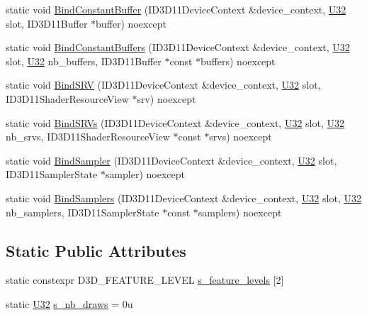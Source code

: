 \begin{DoxyCompactItemize}
\item 
static void \mbox{\hyperlink{structmage_1_1rendering_1_1_pipeline_a983ebf1363c8d3edd6830576e2258e48}{Bind\+Constant\+Buffer}} (I\+D3\+D11\+Device\+Context \&device\+\_\+context, \mbox{\hyperlink{namespacemage_aa5d6eaabaac3cdd01873d6a3d27e90f3}{U32}} slot, I\+D3\+D11\+Buffer $\ast$buffer) noexcept
\item 
static void \mbox{\hyperlink{structmage_1_1rendering_1_1_pipeline_ad3a84d57712b74b98d10946482a78a2b}{Bind\+Constant\+Buffers}} (I\+D3\+D11\+Device\+Context \&device\+\_\+context, \mbox{\hyperlink{namespacemage_aa5d6eaabaac3cdd01873d6a3d27e90f3}{U32}} slot, \mbox{\hyperlink{namespacemage_aa5d6eaabaac3cdd01873d6a3d27e90f3}{U32}} nb\+\_\+buffers, I\+D3\+D11\+Buffer $\ast$const $\ast$buffers) noexcept
\item 
static void \mbox{\hyperlink{structmage_1_1rendering_1_1_pipeline_a28ed2d3639ac344b2d2334de54461ae9}{Bind\+S\+RV}} (I\+D3\+D11\+Device\+Context \&device\+\_\+context, \mbox{\hyperlink{namespacemage_aa5d6eaabaac3cdd01873d6a3d27e90f3}{U32}} slot, I\+D3\+D11\+Shader\+Resource\+View $\ast$srv) noexcept
\item 
static void \mbox{\hyperlink{structmage_1_1rendering_1_1_pipeline_a38de6f4bfefc23eeeb50bdf0cc0e807d}{Bind\+S\+R\+Vs}} (I\+D3\+D11\+Device\+Context \&device\+\_\+context, \mbox{\hyperlink{namespacemage_aa5d6eaabaac3cdd01873d6a3d27e90f3}{U32}} slot, \mbox{\hyperlink{namespacemage_aa5d6eaabaac3cdd01873d6a3d27e90f3}{U32}} nb\+\_\+srvs, I\+D3\+D11\+Shader\+Resource\+View $\ast$const $\ast$srvs) noexcept
\item 
static void \mbox{\hyperlink{structmage_1_1rendering_1_1_pipeline_a3f43c5b1ed2d75d6c5ecf4b477185d0c}{Bind\+Sampler}} (I\+D3\+D11\+Device\+Context \&device\+\_\+context, \mbox{\hyperlink{namespacemage_aa5d6eaabaac3cdd01873d6a3d27e90f3}{U32}} slot, I\+D3\+D11\+Sampler\+State $\ast$sampler) noexcept
\item 
static void \mbox{\hyperlink{structmage_1_1rendering_1_1_pipeline_a10286b4e2637c2956ecbcb0217d694fa}{Bind\+Samplers}} (I\+D3\+D11\+Device\+Context \&device\+\_\+context, \mbox{\hyperlink{namespacemage_aa5d6eaabaac3cdd01873d6a3d27e90f3}{U32}} slot, \mbox{\hyperlink{namespacemage_aa5d6eaabaac3cdd01873d6a3d27e90f3}{U32}} nb\+\_\+samplers, I\+D3\+D11\+Sampler\+State $\ast$const $\ast$samplers) noexcept
\end{DoxyCompactItemize}
\subsection*{Static Public Attributes}
\begin{DoxyCompactItemize}
\item 
static constexpr D3\+D\+\_\+\+F\+E\+A\+T\+U\+R\+E\+\_\+\+L\+E\+V\+EL \mbox{\hyperlink{structmage_1_1rendering_1_1_pipeline_a9748450c877ec6997796826258f3cbda}{s\+\_\+feature\+\_\+levels}} \mbox{[}2\mbox{]}
\item 
static \mbox{\hyperlink{namespacemage_aa5d6eaabaac3cdd01873d6a3d27e90f3}{U32}} \mbox{\hyperlink{structmage_1_1rendering_1_1_pipeline_a47d649cdfea830ee048554accd2cab10}{s\+\_\+nb\+\_\+draws}} = 0u
\end{DoxyCompactItemize}

